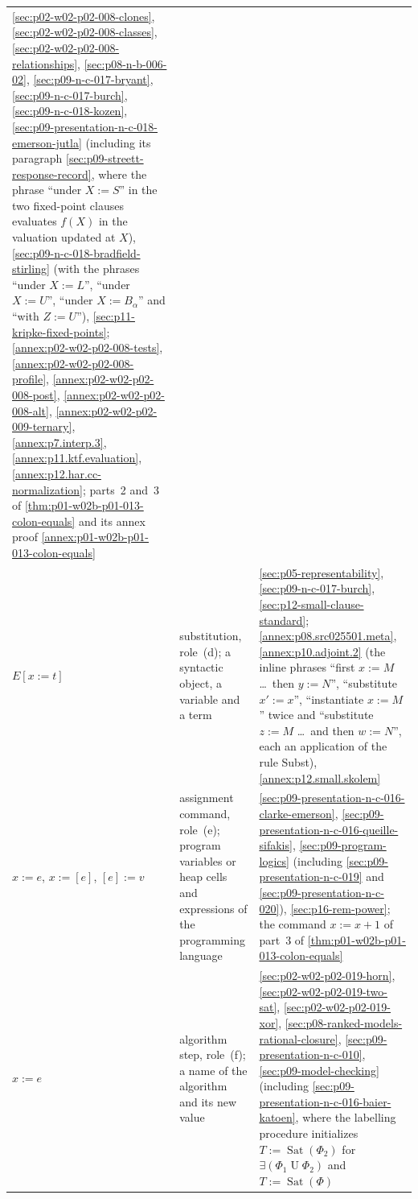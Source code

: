 \begin{longtable}{@{}p{}p{}p{}@{}}
\cref{sec:p02-w02-p02-008-clones}, \cref{sec:p02-w02-p02-008-classes},
\cref{sec:p02-w02-p02-008-relationships}, \cref{sec:p08-n-b-006-02},
\cref{sec:p09-n-c-017-bryant}, \cref{sec:p09-n-c-017-burch},
\cref{sec:p09-n-c-018-kozen},
\cref{sec:p09-presentation-n-c-018-emerson-jutla} (including its paragraph
\cref{sec:p09-streett-response-record}, where the phrase ``under
\(X:=S\)'' in the two fixed-point clauses evaluates \(f(X)\) in the
valuation updated at \(X\)),
\cref{sec:p09-n-c-018-bradfield-stirling} (with the phrases ``under
\(X:=L\)'', ``under \(X:=U\)'', ``under \(X:=B_\alpha\)'' and ``with
\(Z:=U\)''), \cref{sec:p11-kripke-fixed-points};
\cref{annex:p02-w02-p02-008-tests}, \cref{annex:p02-w02-p02-008-profile},
\cref{annex:p02-w02-p02-008-post}, \cref{annex:p02-w02-p02-008-alt},
\cref{annex:p02-w02-p02-009-ternary}, \cref{annex:p7.interp.3},
\cref{annex:p11.ktf.evaluation}, \cref{annex:p12.har.cc-normalization};
parts~2 and~3 of \cref{thm:p01-w02b-p01-013-colon-equals} and its annex
proof \cref{annex:p01-w02b-p01-013-colon-equals} \\
\(E[x:=t]\) & substitution, role~(d); a syntactic object, a variable and a
term & \cref{sec:p05-representability}, \cref{sec:p09-n-c-017-burch},
\cref{sec:p12-small-clause-standard}; \cref{annex:p08.src025501.meta},
\cref{annex:p10.adjoint.2} (the inline phrases ``first \(x:=M\) \ldots\ then
\(y:=N\)'', ``substitute \(x':=x\)'', ``instantiate \(x:=M\)'' twice
and ``substitute \(z:=M\) \ldots\ and then \(w:=N\)'', each an application of the rule Subst), \cref{annex:p12.small.skolem} \\
\(x:=e\), \(x:=[e]\), \([e]:=v\) & assignment command, role~(e); program
variables or heap cells and expressions of the programming language &
\cref{sec:p09-presentation-n-c-016-clarke-emerson},
\cref{sec:p09-presentation-n-c-016-queille-sifakis},
\cref{sec:p09-program-logics} (including
\cref{sec:p09-presentation-n-c-019} and
\cref{sec:p09-presentation-n-c-020}), \cref{sec:p16-rem-power}; the
command \(x:=x+1\) of part~3 of \cref{thm:p01-w02b-p01-013-colon-equals} \\
\(x:=e\) & algorithm step, role~(f); a name of the algorithm and its new
value & \cref{sec:p02-w02-p02-019-horn}, \cref{sec:p02-w02-p02-019-two-sat},
\cref{sec:p02-w02-p02-019-xor}, \cref{sec:p08-ranked-models-rational-closure},
\cref{sec:p09-presentation-n-c-010}, \cref{sec:p09-model-checking}
(including \cref{sec:p09-presentation-n-c-016-baier-katoen}, where the
labelling procedure initializes \(T:=\operatorname{Sat}(\Phi_2)\) for
\(\exists(\Phi_1\mathbin{U}\Phi_2)\) and \(T:=\operatorname{Sat}(\Phi)\)

\end{longtable}
